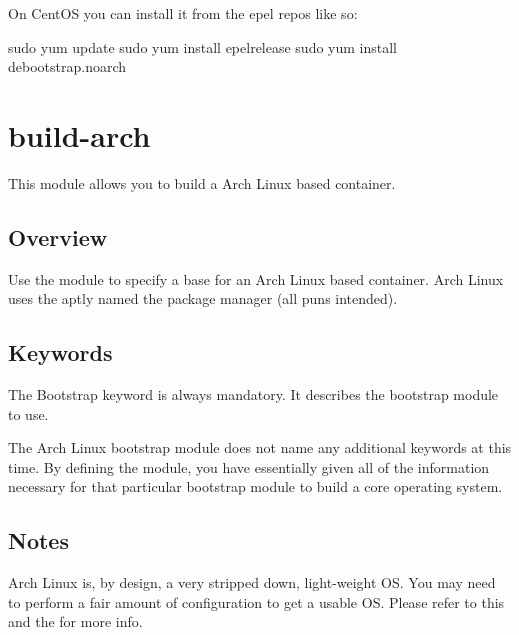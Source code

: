 \documentclass[letterpaper,10pt,english]{sphinxmanual}
\begin{document}
On CentOS you can install it from the epel repos like so:

%
\begin{sphinxVerbatim}[commandchars=\\\{\}]
\PYGZdl{} sudo yum update \PYGZam{}\PYGZam{} sudo yum install epel\PYGZhy{}release \PYGZam{}\PYGZam{} sudo yum install debootstrap.noarch
\end{sphinxVerbatim}


\section{build-arch}
\label{\detokenize{appendix:build-arch}}\label{\detokenize{appendix:sec-build-arch}}
This module allows you to build a Arch Linux based container.


\subsection{Overview}
\label{\detokenize{appendix:id14}}
Use the  module to specify a base for an Arch Linux based container. Arch Linux uses the aptly named the  package manager (all puns intended).


\subsection{Keywords}
\label{\detokenize{appendix:id15}}
%
\begin{sphinxVerbatim}[commandchars=\\\{\}]
 
\end{sphinxVerbatim}

The Bootstrap keyword is always mandatory. It describes the bootstrap module to use.

The Arch Linux bootstrap module does not name any additional keywords at this time. By defining the  module, you have essentially given all of the
information necessary for that particular bootstrap module to build a core operating system.


\subsection{Notes}
\label{\detokenize{appendix:id16}}
Arch Linux is, by design, a very stripped down, light-weight OS. You may need to perform a fair amount of configuration to get a usable OS. Please refer
to this  and
the  for more info.
\end{document}
